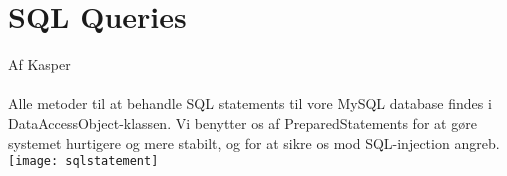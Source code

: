 \section{SQL Queries}
Af Kasper\\\\
Alle metoder til at behandle SQL statements til vore MySQL database findes i DataAccessObject-klassen. Vi benytter os af PreparedStatements for at gøre systemet hurtigere og mere stabilt, og for at sikre os mod SQL-injection angreb.\\
\texttt{[image: sqlstatement]}
